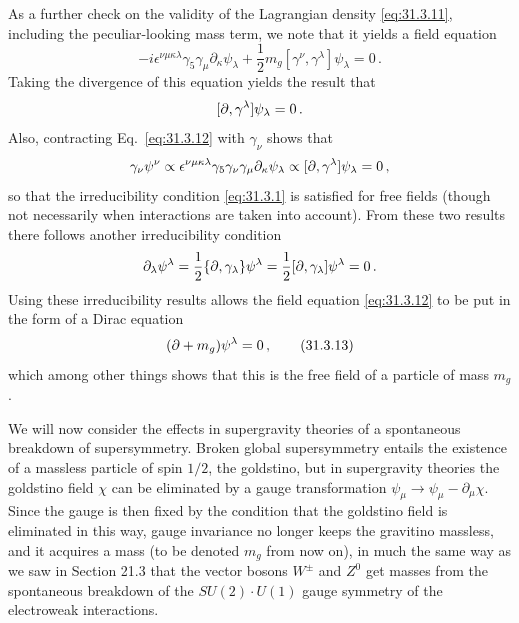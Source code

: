 As a further check on the validity of the Lagrangian density
\eqref{eq:31.3.11}, including the peculiar-looking mass term, we note that
it yields a field equation
\begin{equation}
  -i\epsilon^{\nu\mu\kappa\lambda}\gamma_5\gamma_\mu
  \partial_\kappa\psi_\lambda
  +\frac12m_g[\gamma^\nu,\gamma^\lambda]\psi_\lambda=0\,.
  \tag{31.3.12}\label{eq:31.3.12}
\end{equation}
Taking the divergence of this equation yields the result that
\[
  [\sl{\partial},\gamma^\lambda]\psi_\lambda=0\,.
\]
Also, contracting Eq.~\eqref{eq:31.3.12} with \(\gamma_\nu\) shows that
\[
  \gamma_\nu\psi^\nu
  \propto\epsilon^{\nu\mu\kappa\lambda}
  \gamma_5\gamma_\nu\gamma_\mu\partial_\kappa\psi_\lambda
  \propto[\sl{\partial},\gamma^\lambda]\psi_\lambda=0\,,
\]
so that the irreducibility condition \eqref{eq:31.3.1} is satisfied for
free fields (though not necessarily when interactions are taken into
account). From these two results there follows another irreducibility
condition
\[
  \partial_\lambda\psi^\lambda
  =\frac12\{\sl{\partial},\gamma_\lambda\}\psi^\lambda
  =\frac12[\sl{\partial},\gamma_\lambda]\psi^\lambda=0\,.
\]
Using these irreducibility results allows the field equation
\eqref{eq:31.3.12} to be put in the form of a Dirac equation
\begin{equation}
  (\sl{\partial}+m_g)\psi^\lambda=0\,,
  \tag{31.3.13}\label{eq:31.3.13}
\end{equation}
which among other things shows that this is the free field of a particle
of mass \(m_g\).

We will now consider the effects in supergravity theories of a spontaneous
breakdown of supersymmetry. Broken global supersymmetry entails the
existence of a massless particle of spin \(1/2\), the goldstino, but in
supergravity theories the goldstino field \(\chi\) can be eliminated by a
gauge transformation
\(\psi_\mu\to\psi_\mu-\partial_\mu\chi\). Since the gauge is then fixed by
the condition that the goldstino field is eliminated in this way, gauge
invariance no longer keeps the gravitino massless, and it acquires a mass
(to be denoted \(m_g\) from now on), in much the same way as we saw in
Section 21.3 that the vector bosons \(W^\pm\) and \(Z^0\) get masses from
the spontaneous breakdown of the
\(SU(2)\mathbin{\cdot}U(1)\) gauge symmetry of the electroweak interactions.

